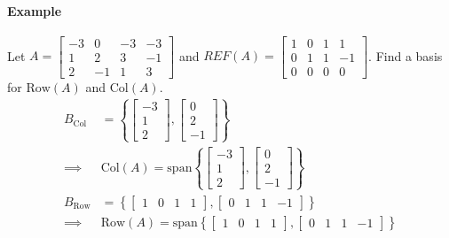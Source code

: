 \paragraph*{Example}
Let $A = \begin{bmatrix}
    -3 & 0 & -3 & -3 \\ 1 & 2 & 3 & -1 \\ 2 & -1 & 1 & 3
\end{bmatrix}$ and $REF(A) = \begin{bmatrix}
    1 & 0 & 1 & 1 \\ 0 & 1 & 1 & -1 \\ 0 & 0 & 0 & 0
\end{bmatrix}$. Find a basis for $\text{Row}(A)$ and $\text{Col}(A)$.
\begin{align*}
    B_\text{Col} &= \left\{\begin{bmatrix}
        -3 \\ 1 \\ 2
    \end{bmatrix}, \begin{bmatrix}
        0 \\ 2 \\ -1
    \end{bmatrix}\right\}\\
    \implies & \text{Col}(A) = \text{span}\left\{\begin{bmatrix}
        -3 \\ 1 \\ 2
    \end{bmatrix}, \begin{bmatrix}        
        0 \\ 2 \\ -1
    \end{bmatrix}\right\}\\
    B_\text{Row} &= \left\{\begin{bmatrix}
        1 & 0 & 1 & 1
    \end{bmatrix}, \begin{bmatrix}
        0 & 1 & 1 & -1
    \end{bmatrix}\right\} \\
    \implies & \text{Row}(A) = \text{span}\left\{\begin{bmatrix}
        1 & 0 & 1 & 1
    \end{bmatrix}, \begin{bmatrix}
        0 & 1 & 1 & -1
    \end{bmatrix}\right\}
\end{align*}

